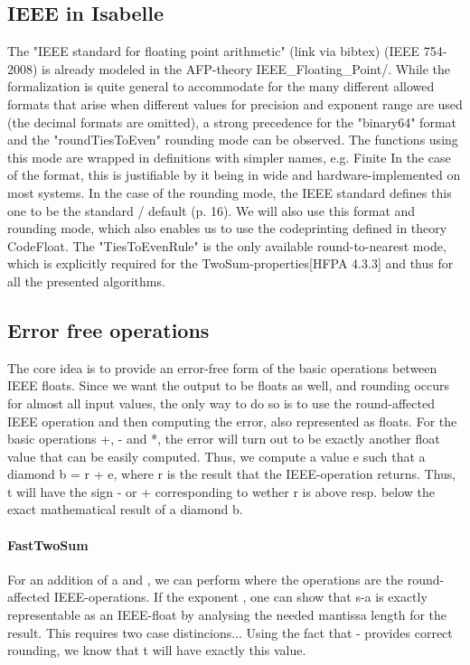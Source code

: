 \documentclass[11pt,a4paper]{article}
\begin{document}
\subsection{IEEE in Isabelle}

The "IEEE standard for floating point arithmetic" (link via bibtex) (IEEE 754-2008) is already modeled in the AFP-theory IEEE\_Floating\_Point/\IEEE.
While the formalization is quite general to accommodate for the many different allowed formats that arise when different values for precision and exponent range are used (the decimal formats are omitted), a strong precedence for the "binary64" format and the "roundTiesToEven" rounding mode can be observed. The functions using this mode are wrapped in definitions with simpler names, e.g. Finite
In the case of the format, this is justifiable by it being in wide and hardware-implemented on most systems.
In the case of the rounding mode, the IEEE standard defines this one to be the standard / default (p. 16).
We will also use this format and rounding mode, which also enables us to use the codeprinting defined in theory CodeFloat. The "TiesToEvenRule" is the only available round-to-nearest mode, which is explicitly required for the TwoSum-properties[HFPA 4.3.3] and thus for all the presented algorithms.

\subsection{Error free operations}

The core idea is to provide an error-free form of the basic operations between IEEE floats. Since we want the output to be floats as well, and rounding occurs for almost all input values, the only way to do so is to use the round-affected IEEE operation and then computing the error, also represented as floats. For the basic operations +, - and *, the error will turn out to be exactly another float value that can be easily computed. Thus, we compute a value e such that a diamond b = r + e,
where r is the result that the IEEE-operation returns.
Thus, t will have the sign - or + corresponding to wether r is above resp. below the exact mathematical result of a diamond b.

\paragraph{FastTwoSum}

For an addition of a and , we can perform 
where the operations are the round-affected IEEE-operations.
If the exponent , one can show that s-a is exactly representable as an IEEE-float by analysing the needed mantissa length for the result. This requires two case distincions... Using the fact that - provides correct rounding, we know that t will have exactly this value.
\end{document}
